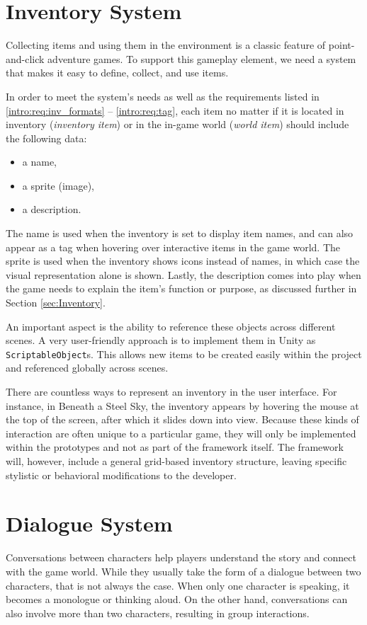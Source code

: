 \section{Inventory System}
Collecting items and using them in the environment is a classic feature of point-and-click adventure games. To support this gameplay element, we need a system that makes it easy to define, collect, and use items.

In order to meet the system's needs as well as the requirements listed in \ref{intro:req:inv_formats} – \ref{intro:req:tag}, each item no matter if it is located in inventory (\textit{inventory item}) or in the in-game world (\textit{world item}) should include the following data:
\begin{itemize}
\item a name,
\item a sprite (image),
\item a description.
\end{itemize}

The name is used when the inventory is set to display item names, and can also appear as a tag when hovering over interactive items in the game world. The sprite is used when the inventory shows icons instead of names, in which case the visual representation alone is shown. Lastly, the description comes into play when the game needs to explain the item's function or purpose, as discussed further in Section \ref{sec:Inventory}.

An important aspect is the ability to reference these objects across different scenes. A very user-friendly approach is to implement them in Unity as \verb|ScriptableObject|s. This allows new items to be created easily within the project and referenced globally across scenes.

There are countless ways to represent an inventory in the user interface. For instance, in Beneath a Steel Sky, the inventory appears by hovering the mouse at the top of the screen, after which it slides down into view. Because these kinds of interaction are often unique to a particular game, they will only be implemented within the prototypes and not as part of the framework itself. The framework will, however, include a general grid-based inventory structure, leaving specific stylistic or behavioral modifications to the developer.

\section{Dialogue System}
Conversations between characters help players understand the story and connect with the game world. While they usually take the form of a dialogue between two characters, that is not always the case. When only one character is speaking, it becomes a monologue or thinking aloud. On the other hand, conversations can also involve more than two characters, resulting in group interactions. 

